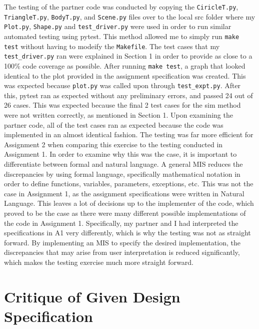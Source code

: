 \documentclass[12pt]{article}
\begin{document}
The testing of the partner code was conducted by copying the \texttt{CiricleT.py}, \texttt{TriangleT.py}, \texttt{BodyT.py}, and \texttt{Scene.py} files over to the local src folder where my \texttt{Plot.py}, \texttt{Shape.py} and \texttt{test\_driver.py} were used in order to run similar automated testing using pytest. This method allowed me to simply run \texttt{make test} without having to modeify the \texttt{Makefile}. The test cases that my \texttt{test\_driver.py} ran were explained in Section 1 in order to provide as close to a 100\% code coverage as possible. After running \texttt{make test}, a graph that looked identical to the plot provided in the assignment specification was created. This was expected because \texttt{plot.py} was called upon through \texttt{test\_expt.py}. After this, pytest ran as expected without any preliminary errors, and passed 24 out of 26 cases. This was expected because the final 2 test cases for the sim method were not written correctly, as mentioned in Section 1. Upon examining the partner code, all of the test cases ran as expected because the code was implemented in an almost identical fashion. 
\newline
\newline
The testing was far more efficient for Assignment 2 when comparing this exercise to the testing conducted in Assignment 1. In order to examine why this was the case, it is important to differentiate between formal and natural language. A general MIS reduces the discrepancies by using formal language, specifically mathematical notation in order to define functions, variables, parameters, exceptions, etc. This was not the case in Assignment 1, as the assignment specifications were written in Natural Language. This leaves a lot of decisions up to the implementer of the code, which proved to be the case as there were many different possible implementations of the code in Assignment 1. Specifically, my partner and I had interpreted the specifications in A1 very differently, which is why the testing was not as straight forward. By implementing an MIS to specify the desired implementation, the discrepancies that may arise from user interpretation is reduced significantly, which makes the testing exercise much more straight forward.
\newpage

\section{Critique of Given Design Specification}
\end{document}
